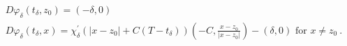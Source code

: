 \begin{gather*}
	D \varphi_{\delta}(t_{\delta}, z_0) = \left(- \delta, 0 \right) \\
	D \varphi_{\delta}(t_{\delta}, x) = \chi_{\delta}^{\prime}\left(\lvert x - z_0 \rvert + C(T - t_{\delta})\right)\left(- C, \frac{x - z_0}{\lvert x - z_0 \rvert}\right) - \left(\delta, 0 \right) \text{ for } x \neq z_0 \ .
\end{gather*}